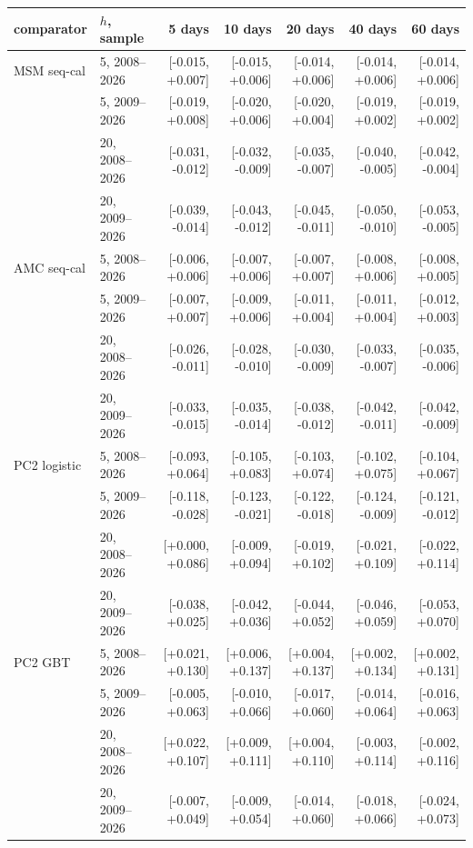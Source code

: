\begin{tabular}{llrrrrr}\toprule
comparator & $h$, sample & 5 days & 10 days & 20 days & 40 days & 60 days\\\midrule
MSM seq-cal & 5, 2008--2026 & [-0.015, +0.007] & [-0.015, +0.006] & [-0.014, +0.006] & [-0.014, +0.006] & [-0.014, +0.006]\\
 & 5, 2009--2026 & [-0.019, +0.008] & [-0.020, +0.006] & [-0.020, +0.004] & [-0.019, +0.002] & [-0.019, +0.002]\\
 & 20, 2008--2026 & [-0.031, -0.012] & [-0.032, -0.009] & [-0.035, -0.007] & [-0.040, -0.005] & [-0.042, -0.004]\\
 & 20, 2009--2026 & [-0.039, -0.014] & [-0.043, -0.012] & [-0.045, -0.011] & [-0.050, -0.010] & [-0.053, -0.005]\\
AMC seq-cal & 5, 2008--2026 & [-0.006, +0.006] & [-0.007, +0.006] & [-0.007, +0.007] & [-0.008, +0.006] & [-0.008, +0.005]\\
 & 5, 2009--2026 & [-0.007, +0.007] & [-0.009, +0.006] & [-0.011, +0.004] & [-0.011, +0.004] & [-0.012, +0.003]\\
 & 20, 2008--2026 & [-0.026, -0.011] & [-0.028, -0.010] & [-0.030, -0.009] & [-0.033, -0.007] & [-0.035, -0.006]\\
 & 20, 2009--2026 & [-0.033, -0.015] & [-0.035, -0.014] & [-0.038, -0.012] & [-0.042, -0.011] & [-0.042, -0.009]\\
PC2 logistic & 5, 2008--2026 & [-0.093, +0.064] & [-0.105, +0.083] & [-0.103, +0.074] & [-0.102, +0.075] & [-0.104, +0.067]\\
 & 5, 2009--2026 & [-0.118, -0.028] & [-0.123, -0.021] & [-0.122, -0.018] & [-0.124, -0.009] & [-0.121, -0.012]\\
 & 20, 2008--2026 & [+0.000, +0.086] & [-0.009, +0.094] & [-0.019, +0.102] & [-0.021, +0.109] & [-0.022, +0.114]\\
 & 20, 2009--2026 & [-0.038, +0.025] & [-0.042, +0.036] & [-0.044, +0.052] & [-0.046, +0.059] & [-0.053, +0.070]\\
PC2 GBT & 5, 2008--2026 & [+0.021, +0.130] & [+0.006, +0.137] & [+0.004, +0.137] & [+0.002, +0.134] & [+0.002, +0.131]\\
 & 5, 2009--2026 & [-0.005, +0.063] & [-0.010, +0.066] & [-0.017, +0.060] & [-0.014, +0.064] & [-0.016, +0.063]\\
 & 20, 2008--2026 & [+0.022, +0.107] & [+0.009, +0.111] & [+0.004, +0.110] & [-0.003, +0.114] & [-0.002, +0.116]\\
 & 20, 2009--2026 & [-0.007, +0.049] & [-0.009, +0.054] & [-0.014, +0.060] & [-0.018, +0.066] & [-0.024, +0.073]\\

\end{tabular}
